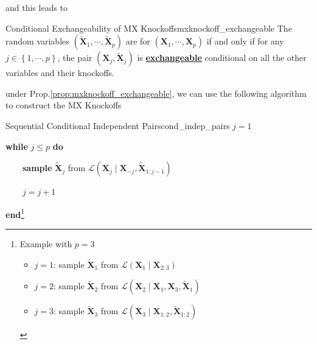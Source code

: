 \documentclass[twoside]{article}
\begin{document}
and this leads to 
\begin{proposition}{Conditional Exchangeability of MX Knockoffs}{mxknockoff_exchangeable}
    The random variables $ (\tilde{\mathbf{X}}_1,\cdots,\tilde{\mathbf{X}}_p) $ are  for $({\mathbf{X}}_1,\cdots,{\mathbf{X}}_p)$ if and only if for any $j\in \left\{1,\cdots,p\right\}$, the pair $({\mathbf{X}}_j,\tilde{\mathbf{X}}_j)$ is \textbf{\underline{exchangeable}} conditional on all the other variables and their knockoffs.
\end{proposition}
under Prop.\ref{prop:mxknockoff_exchangeable}, we can use the following algorithm to construct the MX Knockoffs 
\begin{algorithm}{Sequential Conditional Independent Pairs}{cond_indep_pairs}
    $j=1$ 
                        
    \textbf{while} $j\leq p$ \textbf{do}

    \ \ \ \ \textbf{sample} $\tilde{\mathbf{X}}_j$ from $\mathcal{L}(\mathbf{X}_j\mid \mathbf{X}_{-j},\tilde{\mathbf{X}}_{1:j-1})$

    \ \ \ \  $j=j+1$

    \textbf{end}\footnote{Example with $p=3$\begin{itemize} \item $j=1$: sample $\tilde{\mathbf{X}}_1$ from $\mathcal{L}(\mathbf{X}_1 \mid \mathbf{X}_{2:3})$
        \item $j=2$: sample $\tilde{\mathbf{X}}_2$ from $\mathcal{L}(\mathbf{X}_2\mid \mathbf{X}_1,\mathbf{X}_3,\tilde{\mathbf{X}}_1)$ 
        \item $j=3$: sample $\tilde{\mathbf{X}}_3$ from $\mathcal{L}(\mathbf{X}_3\mid \mathbf{X}_{1:2},\tilde{\mathbf{X}}_{1:2})$ \end{itemize} }
\end{algorithm}
\end{document}

